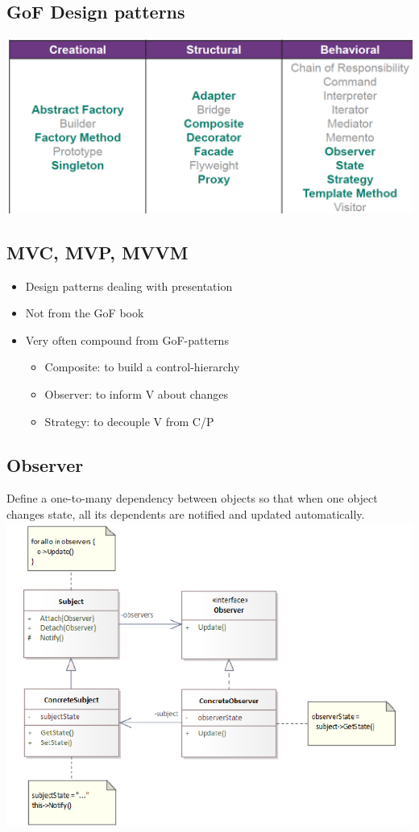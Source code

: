 \subsection{GoF Design patterns}
\includegraphics[width=\linewidth]{../img/gof_design_patterns.png}

\subsection{MVC, MVP, MVVM}
\begin{itemize}
    \item Design patterns dealing with presentation
    \item Not from the GoF book
    \item Very often compound from GoF-patterns
    \begin{itemize}
        \item Composite: to build a control-hierarchy
        \item Observer: to inform V about changes
        \item Strategy: to decouple V from C/P
    \end{itemize}
\end{itemize}

\subsection{Observer}
Define a one-to-many dependency between objects so that when one object changes state, all its dependents are notified and updated automatically.\\
\includegraphics[width=0.85\linewidth]{../img/observer_pattern.png}

